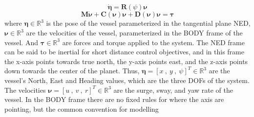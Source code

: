 \begin{equation} \label{EQ: eta_dot}
    \bm{\dot{\eta}} = \textbf{R}(\psi)\bm{\nu}    
\end{equation}
\begin{equation} \label{EQ: Vessel Dynamics}
    \textbf{M}\bm{\dot{\nu}} + \textbf{C}(\bm{\nu})\bm{\nu} + \textbf{D}(\bm{\nu})\bm{\nu} = \bm{\tau}
\end{equation} %
where $\bm{\eta} \in \mathbb{R}^3$ is the pose of the vessel parameterized in the tangential plane \gls{NED}, $\bm{\nu}\in \mathbb{R}^3$ are
the velocities of the vessel, parameterized in the BODY frame of the vessel. And $\bm{\tau}\in \mathbb{R}^3$ are forces and torque applied to the
system. The \gls{NED} frame can be said to be inertial for short distance control objectives, and in this frame 
the x-axis points towards true north, the y-axis points east, and the z-axis points down towards the center of the planet.
Thus, $\bm{\eta} = [x\ , \ y \ , \ \psi]^T \in \mathbb{R}^{3}$ are the vessel's North, East and Heading values, 
which are the three \gls{DOF}s of the system. The velocities $\bm{\nu} = [u\ , \ v \ , \ r]^T \in \mathbb{R}^{3}$ are the
surge, sway, and yaw rate of the vessel. In the BODY frame there are no fixed rules for where the axis are pointing, but the common convention for modelling
